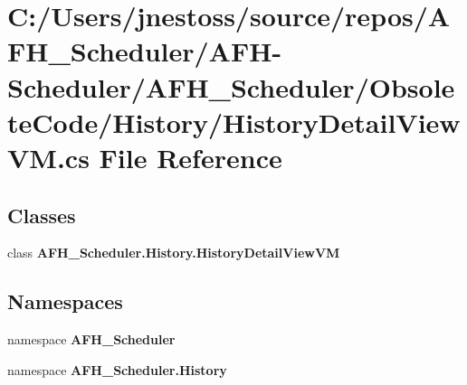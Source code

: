 \section{C\+:/\+Users/jnestoss/source/repos/\+A\+F\+H\+\_\+\+Scheduler/\+A\+F\+H-\/\+Scheduler/\+A\+F\+H\+\_\+\+Scheduler/\+Obsolete\+Code/\+History/\+History\+Detail\+View\+VM.cs File Reference}
\label{_history_detail_view_v_m_8cs}
\subsection*{Classes}
\begin{DoxyCompactItemize}
\item 
class \textbf{ A\+F\+H\+\_\+\+Scheduler.\+History.\+History\+Detail\+View\+VM}
\end{DoxyCompactItemize}
\subsection*{Namespaces}
\begin{DoxyCompactItemize}
\item 
namespace \textbf{ A\+F\+H\+\_\+\+Scheduler}
\item 
namespace \textbf{ A\+F\+H\+\_\+\+Scheduler.\+History}
\end{DoxyCompactItemize}
